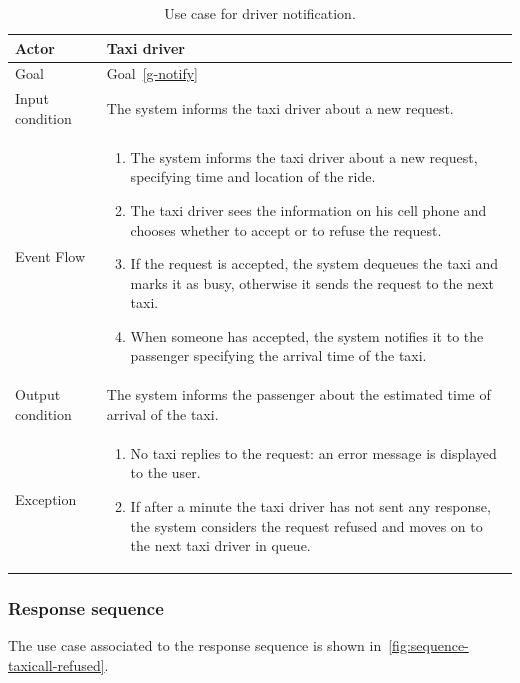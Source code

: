 \begin{table}
\begin{center}
\begin{tabular}{| l | p{} |}
\hline
Actor & Taxi driver \\
\hline
Goal & Goal~\ref{g-notify}
\\
\hline
Input condition & The system informs the taxi driver about a new request.  \\
\hline
Event Flow & \begin{enumerate}
	\item The system informs the taxi driver about a new request, specifying time and location of the ride.
	\item The taxi driver sees the information on his cell phone and chooses whether to accept or to refuse the request.
	\item If the request is accepted, the system dequeues the taxi and marks it as busy, otherwise it sends the request to the next taxi.
	\item When someone has accepted, the system notifies it to the passenger specifying the arrival time of the taxi.
	\end{enumerate}
\\
\hline
Output condition & The system informs the passenger about the estimated time of arrival of the taxi. \\
\hline
Exception &
\begin{enumerate}
	\item No taxi replies to the request: an error message is displayed to the user.
	\item If after a minute the taxi driver has not sent any response, the system considers the request refused and moves on to the next taxi driver in queue.
\end{enumerate}
\\
\hline
\end{tabular}
\end{center}
\caption{Use case for driver notification.}
\label{usecase-drivernotification}
\end{table}

\subsubsection{Response sequence}
The use case associated to the response sequence is shown in~\autoref{fig:sequence-taxicall-refused}.

